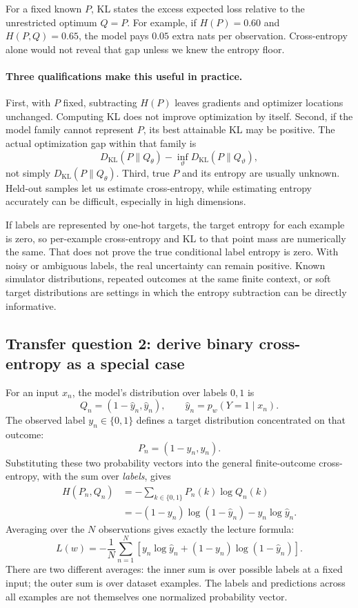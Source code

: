 For a fixed known $P$, KL states the excess expected loss relative to the
unrestricted optimum $Q=P$. For example, if $H(P)=0.60$ and $H(P,Q)=0.65$,
the model pays $0.05$ extra nats per observation. Cross-entropy alone would not
reveal that gap unless we knew the entropy floor.

\paragraph{Three qualifications make this useful in practice.}
First, with $P$ fixed, subtracting $H(P)$ leaves gradients and optimizer locations
unchanged. Computing KL does not improve optimization by itself. Second, if the
model family cannot represent $P$, its best attainable KL may be positive.
The actual optimization gap within that family is
\[
D_{\mathrm{KL}}(P\|Q_\theta)-\inf_{\vartheta}
D_{\mathrm{KL}}(P\|Q_\vartheta),
\]
not simply $D_{\mathrm{KL}}(P\|Q_\theta)$. Third, true $P$ and its entropy are
usually unknown. Held-out samples let us estimate cross-entropy, while estimating
entropy accurately can be difficult, especially in high dimensions.

If labels are represented by one-hot targets, the target entropy for each
example is zero, so per-example cross-entropy and KL to that point mass are
numerically the same. That does not prove the true conditional label entropy is
zero. With noisy or ambiguous labels, the real uncertainty can remain positive.
Known simulator distributions, repeated outcomes at the same finite context,
or soft target distributions are settings in which the entropy subtraction can
be directly informative.

\subsection{Transfer question 2: derive binary cross-entropy as a special case}
For an input $x_n$, the model's distribution over labels $0,1$ is
\[
Q_n=(1-\hat y_n,\hat y_n),\qquad
\hat y_n=p_w(Y=1\mid x_n).
\]
The observed label $y_n\in\{0,1\}$ defines a target distribution concentrated on
that outcome:
\[
P_n=(1-y_n,y_n).
\]
Substituting these two probability vectors into the general finite-outcome
cross-entropy, with the sum over \emph{labels}, gives
\begin{align*}
H(P_n,Q_n)
&=-\sum_{k\in\{0,1\}}P_n(k)\log Q_n(k)\\
&=-(1-y_n)\log(1-\hat y_n)-y_n\log\hat y_n.
\end{align*}
Averaging over the $N$ observations gives exactly the lecture formula:
\[
\boxed{L(w)=-\frac1N\sum_{n=1}^N
\left[y_n\log\hat y_n+(1-y_n)\log(1-\hat y_n)\right].}
\]
There are two different averages: the inner sum is over possible labels at a
fixed input; the outer sum is over dataset examples. The labels and predictions
across all examples are not themselves one normalized probability vector.

